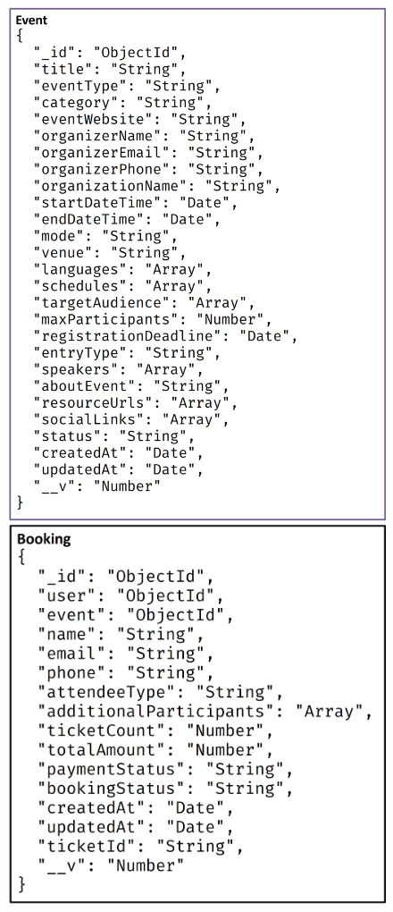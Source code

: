 \documentclass[twoside,a4paper,openright]{report} %
\begin{document}
\begin{figure}[ht]
	\begin{minipage}{0.45\textwidth}
		\centering
		\includegraphics[scale=0.45]{table3.jpg}     
	\end{minipage}\hfill
	\begin{minipage}{0.45\textwidth}
		\centering
		\includegraphics[scale=0.45]{table4.jpg}     
	\end{minipage}
\end{figure}
\end{document}
